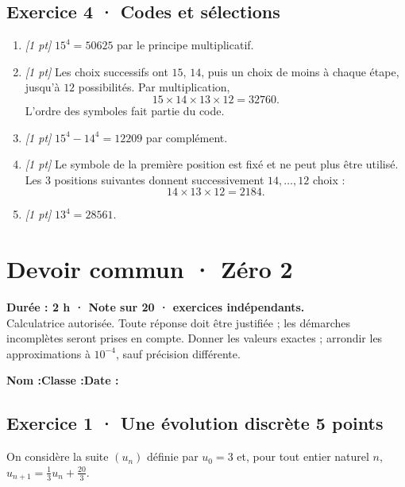 \subsection*{Exercice 4 · Codes et sélections}\begin{enumerate}

\item \textit{[1 pt]} $15^4=50625$ par le principe multiplicatif.

\item \textit{[1 pt]} Les choix successifs ont $15$, $14$, puis un choix de moins à chaque étape, jusqu'à $12$ possibilités. Par multiplication,
\[15\times14\times13\times12=32760.\]
L'ordre des symboles fait partie du code.

\item \textit{[1 pt]} $15^4-14^4=12209$ par complément.

\item \textit{[1 pt]} Le symbole de la première position est fixé et ne peut plus être utilisé. Les $3$ positions suivantes donnent successivement $14,\ldots,12$ choix :
\[14\times13\times12=2184.\]

\item \textit{[1 pt]} $13^4=28561$.

\end{enumerate}

\fi

\mxnewpage{}\label{sujet:3-2}

\section*{Devoir commun · Zéro 2}


\textbf{Durée : 2 h · Note sur 20 ·  exercices indépendants.}\\Calculatrice autorisée. Toute réponse doit être justifiée ; les démarches incomplètes seront prises en compte. Donner les valeurs exactes ; arrondir les approximations à $10^{-4}$, sauf précision différente.

\smallskip\textbf{Nom :}\enspace\dotfill\quad\textbf{Classe :}\enspace\dotfill\quad\textbf{Date :}\enspace\dotfill

\subsection*{Exercice 1 · Une évolution discrète \hfill 5 points}On considère la suite $(u_n)$ définie par $u_0=3$ et, pour tout entier naturel $n$, $u_{n+1}=\frac{1}{3}u_n+\frac{20}{3}$.


